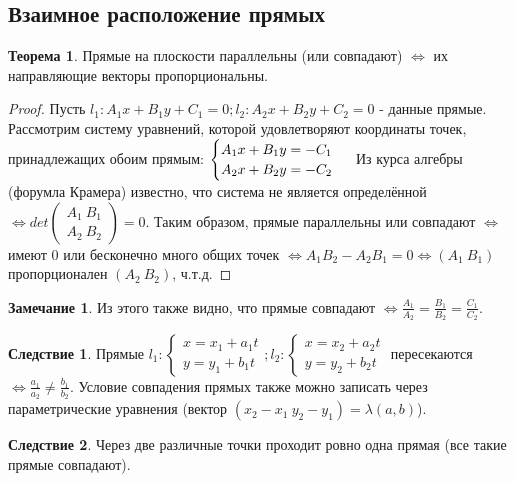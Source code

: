 \documentclass[a4paper, 12pt]{article}
\theoremstyle{definition}
\newtheorem*{theorem}{Теорема}
\newtheorem*{consequense}{Следствие}
\newtheorem*{remark}{Замечание}
\begin{document}
	\subsection{Взаимное расположение прямых}
	\begin{theorem}
		Прямые на плоскости параллельны (или совпадают) $\Leftrightarrow$ их направляющие векторы пропорциональны.
	\end{theorem}
	\begin{proof}
		Пусть $l_{1}: A_{1}x + B_{1}y + C_{1} = 0; l_{2}: A_{2}x + B_{2}y + C_{2} = 0$ - данные прямые.
		Рассмотрим систему уравнений, которой удовлетворяют координаты точек, принадлежащих обоим прямым: $\begin{cases}A_{1}x + B_{1}y = -C_{1}\\A_{2}x + B_{2}y = -C_{2}\end{cases}\\$ Из курса алгебры (форумла Крамера) известно, что система не является определённой $\Leftrightarrow det\begin{pmatrix} A_{1} \ B_{1}\\A_{2} \ B_{2}\end{pmatrix} = 0$. Таким образом, прямые параллельны или совпадают $\Leftrightarrow$ имеют 0 или бесконечно много общих точек $\Leftrightarrow A_{1}B_{2} - A_{2}B_{1} = 0 \Leftrightarrow (A_{1}\ B_{1})$ пропорционален $(A_{2}\ B_{2})$, ч.т.д. 
	\end{proof}
	\begin{remark}
		Из этого также видно, что прямые совпадают $\Leftrightarrow \frac{A_{1}}{A_{2}} = \frac{B_{1}}{B_{2}} = \frac{C_{1}}{C_{2}}$. 
	\end{remark}
	\begin{consequense}
		Прямые $l_{1}: \begin{cases}x = x_{1} + a_{1}t \\ y = y_{1} + b_{1}t\end{cases}; l_{2}: \begin{cases}x = x_{2} + a_{2}t \\ y = y_{2} + b_{2}t\end{cases}$ пересекаются $\Leftrightarrow \frac{a_{1}}{a_{2}} \neq \frac{b_{1}}{b_{2}}$.
		Условие совпадения прямых также можно записать через параметрические уравнения (вектор $(x_{2} - x_{1} \ y_{2} - y_{1}) = \lambda(a, b)$).
	\end{consequense}
	\begin{consequense}
		Через две различные точки проходит ровно одна прямая (все такие прямые совпадают).
	\end{consequense}
\end{document}
